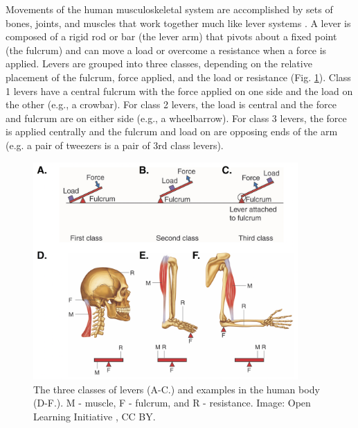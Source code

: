 \documentclass[12pt]{article}
\begin{document}
Movements of the human musculoskeletal system are accomplished by sets of bones, joints, and muscles that work together much like lever systems \cite{leversOLI,openStax2016lever}. A lever is composed of a rigid rod or bar (the lever arm) that pivots about a fixed point (the fulcrum) and can move a load or overcome a resistance when a force is applied. Levers are grouped into three classes, depending on the relative placement of the fulcrum, force applied, and the load or resistance (Fig. \ref{fig:levers}). Class 1 levers have a central fulcrum with the force applied on one side and the load on the other (e.g., a crowbar). For class 2 levers, the load is central and the force and fulcrum are on either side (e.g., a wheelbarrow). For class 3 levers, the force is applied centrally and the fulcrum and load on are opposing ends of the arm (e.g. a pair of tweezers is a pair of 3rd class levers). 

\begin{figure}[h!]
\centering
\includegraphics[width=0.9\textwidth]{figures/levers2.png}
\caption{The three classes of levers (A-C.) and examples in the human body (D-F.). M - muscle, F - fulcrum, and R - resistance. Image: Open Learning Initiative \cite{leversOLI}, CC BY.}
\label{fig:levers}
\end{figure}
\end{document}

